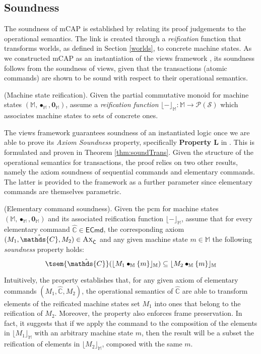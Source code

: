 \subsection{Soundness}

\label{sec:mcapSound}

The soundness of mCAP is established by relating its proof judgements to the operational semantics. The link is created through a \textit{reification} function that transforms worlds, as defined in Section \ref{worlds}, to concrete machine states. As we constructed mCAP as an instantiation of the views framework \cite{views}, its soundness follows from the soundness of views, given that the transactions (atomic commands) are shown to be sound with respect to their operational semantics.

\begin{param}
	(Machine state reification).
	Given the partial commutative monoid for machine states $(\mathbb{M}, \bullet_\mathbb{M}, \mathbf{0}_\mathbb{M})$, assume a \emph{reification function} $\lfloor - \rfloor_\mathbb{M} : \mathbb{M} \rightarrow \mathcal{P}(\mathcal{S})$ which associates machine states to sets of concrete ones.
\end{param}

The views framework guarantees soundness of an instantiated logic once we are able to prove its \textit{Axiom Soundness} property, specifically \textbf{Property L} in \cite{views}. This is formulated and proven in Theorem \ref{thm:soundTrans}. Given the structure of the operational semantics for transactions, the proof relies on two other results, namely the axiom soundness of sequential commands and elementary commands. The latter is provided to the framework as a further parameter since elementary commands are themselves parametric.

\begin{param}
	\label{param:ecmdSound}
	(Elementary command soundness).
	Given the pcm for machine states $(\mathbb{M}, \bullet_\mathbb{M}, \mathbf{0}_\mathbb{M})$ and its associated reification function $\lfloor - \rfloor_\mathbb{M}$, assume that for every elementary command $\hat{\mathds{C}} \in \mathsf{ECmd}$, the corresponding axiom $(M_1, \hat{\mathds{C}}, M_2) \in \textsc{Ax}_{\hat{\mathsf{C}}}$ and any given machine state $m \in \mathbb{M}$ the following \emph{soundness} property holds:
	\[
		\tsem{\hat{\mathds{C}}}(\lfloor M_1 \bullet_\mathbb{M} \{m\} \rfloor_\mathbb{M}) \subseteq \lfloor M_2 \bullet_\mathbb{M} \{m\} \rfloor_\mathbb{M}
	\]
\end{param}
Intuitively, the property establishes that, for any given axiom of elementary commands $(M_1, \hat{\mathds{C}}, M_2)$, the operational semantics of $\hat{\mathds{C}}$ are able to transform elements of the reificated machine states set $M_1$ into ones that belong to the reification of $M_2$. Moreover, the property also enforces frame preservation. In fact, it suggests that if we apply the command to the composition of the elements in $\lfloor M_1 \rfloor_\mathbb{M}$ with an arbitrary machine state $m$, then the result will be a subset the reification of elements in $\lfloor M_2 \rfloor_\mathbb{M}$, composed with the same $m$.

